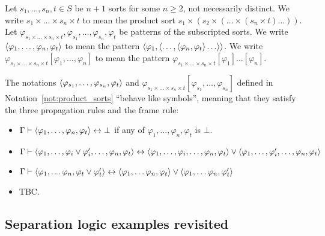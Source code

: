 \documentclass{amsart}
\begin{document}
\begin{notation}
\label{not:product_sorts}
Let $s_1,\dots,s_n, t\in S$ be $n+1$ sorts for some $n \ge 2$,
not necessarily distinct.
We write $s_1 \times \dots \times s_n \times t$ to mean the product sort
$s_1 \times 
(s_2 \times ( \dots \times (s_n \times t) \dots ))$.
Let $\varphi_{s_1 \times \dots \times s_n \times t},
\varphi_{s_1}, \dots, \varphi_{s_n},
\varphi_t$ be patterns of the subscripted sorts.
We write
$\langle \varphi_1,\dots,\varphi_n,\varphi_t \rangle$
to mean the pattern
$\la \varphi_1, \la \dots, \la \varphi_n,\varphi_t\ra  \dots\ra \ra$.
We write
$\varphi_{s_1 \times \dots \times s_n \times t}[\varphi_1,\dots,\varphi_n]$
to mean the pattern
$\varphi_{s_1 \times \dots \times s_n \times t}[\varphi_1]\dots[\varphi_n]$.
\end{notation}

\begin{proposition}
The notations $\langle \varphi_{s_1},\dots,\varphi_{s_n},\varphi_t \rangle$
and $\varphi_{s_1 \times \dots \times s_n \times 
t}[\varphi_{s_1},\dots,\varphi_{s_n}]$
defined in Notation~\ref{not:product_sorts}
``behave like symbols'', meaning that they satisfy
the three propagation rules and the frame rule:
\begin{itemize}
\item $\Gamma \vdash \langle \varphi_1,\dots,\varphi_n,\varphi_t\rangle  \leftrightarrow \bot$
if any of $\varphi_1,\dots,\varphi_n,\varphi_t$ is $\bot$.
\item $\Gamma \vdash \langle \varphi_1,\dots,\varphi_i \vee 
\varphi'_i,\dots,\varphi_n,\varphi_t\rangle  \leftrightarrow
\langle \varphi_1,\dots,\varphi_i,\dots,\varphi_n,\varphi_t\rangle 
\vee
\langle \varphi_1,\dots,\varphi'_i,\dots,\varphi_n,\varphi_t\rangle $
\item $\Gamma \vdash \langle \varphi_1,\dots\varphi_n,\varphi_t\vee \varphi'_t\rangle  
\leftrightarrow
\langle \varphi_1,\dots\varphi_n,\varphi_t\rangle  
\vee
\langle \varphi_1,\dots\varphi_n,\varphi'_t\rangle  $
\item TBC.
\end{itemize}
\end{proposition}

\subsection{Separation logic examples revisited}
\label{sec:recursive_symbols:examples_revisited}
\end{document}
